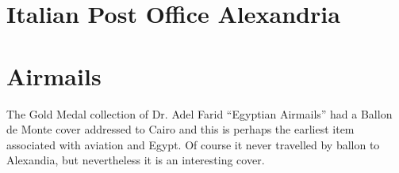 \documentclass[justified]{tufte-book}
\begin{document}




\chapter{Italian Post Office Alexandria}


\newpage
\chapter{Airmails}

The Gold Medal collection of Dr. Adel Farid ``Egyptian Airmails'' had a Ballon de Monte cover addressed to Cairo and this is perhaps the earliest item associated with aviation and Egypt. Of course it never travelled by ballon to Alexandia, but nevertheless it is an interesting cover.

\newpage




\newpage



\newpage




\newpage


\normalsize
\end{document}
